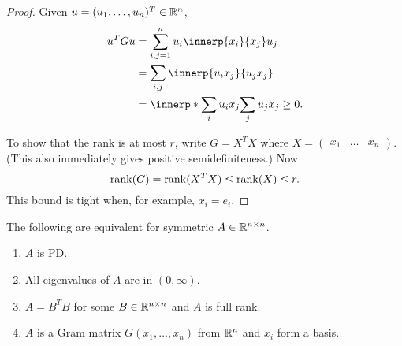 \begin{proof}
    Given $u = (u_1, \dots, u_n)^T \in \mathbb{R}^n$, \begin{align*}
        u^T G u &= \sum_{i,j=1}^n u_i \innerp{x_i}{x_j} u_j \\
            &= \sum_{i,j} \innerp{u_i x_j}{u_j x_j} \\
            &= \innerp*{\sum_i u_i x_j}{\sum_j u_j x_j} \ge 0.
    \end{align*}

    To show that the rank is at most $r$, write $G = X^T X$ where
    $X = \begin{pmatrix}
        x_1 & \dots & x_n
    \end{pmatrix}$.
    (This also immediately gives positive semidefiniteness.)
    Now \[
        \operatorname{rank}(G) = \operatorname{rank}(X^T X) \le \operatorname{rank}(X) \le r.
    \] This bound is tight when, for example, $x_i = e_i$.
\end{proof}

\begin{theorem} \label{thm:pd-equiv}
    The following are equivalent for symmetric $A \in \mathbb{R}^{n \times n}$.
    \begin{enumerate}
        \item $A$ is PD.
        \item All eigenvalues of $A$ are in $(0, \infty)$.
        \item $A = B^T B$ for some $B \in \mathbb{R}^{n \times n}$ and $A$ is full
            rank.
        \item $A$ is a Gram matrix $G(x_1, \dots, x_n)$ from $\mathbb{R}^n$ and
            $x_i$ form a basis.
    \end{enumerate}
\end{theorem}

